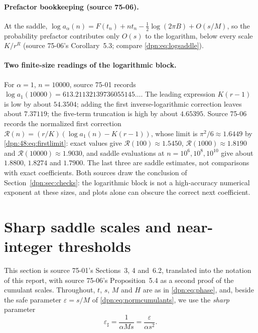 \documentclass[11pt]{article}
\numberwithin{equation}{section}
\theoremstyle{definition}\newtheorem{definition}[theorem]{Definition}
\theoremstyle{remark}\newtheorem{remark}[theorem]{Remark}
\newcommand{\eps}{\varepsilon}
\newcommand{\src}[1]{\textup{(source #1)}}
\newcommand{\epsh}{\varepsilon_{\sharp}}
\begin{document}
\paragraph{Prefactor bookkeeping \src{75-06}.}
At the saddle,
$\log a_\alpha(n)=F(t_n)+nt_n-\tfrac12\log(2\pi B)+O(s/M)$, so the probability
prefactor contributes only $O(s)$ to the logarithm, below every scale
$K/r^R$ (source 75-06's Corollary~5.3; compare \eqref{dpn:eq:logsaddle}).

\paragraph{Two finite-size readings of the logarithmic block.}
For $\alpha=1$, $n=10000$, source 75-01 records
$\log a_1(10000)=613.21132139736055145\ldots$.  The leading expression
$K(r-1)$ is low by about $54.3504$; adding the first inverse-logarithmic
correction leaves about $7.37119$; the five-term truncation is high by about
$4.65395$.  Source 75-06 records the normalized first correction
$\mathcal R(n)=(r/K)(\log a_1(n)-K(r-1))$, whose limit is $\pi^2/6\approx1.6449$
by \eqref{dpn:48:eq:firstlimit}: exact values give $\mathcal R(100)\approx1.5450$,
$\mathcal R(1000)\approx1.8190$ and $\mathcal R(10000)\approx1.9030$, and
saddle evaluations at $n=10^6,10^8,10^{10}$ give about $1.8800$, $1.8274$ and
$1.7900$.  The last three are saddle estimates, not comparisons with exact
coefficients.  Both sources draw the conclusion of
Section~\ref{dpn:sec:checks}: the logarithmic block is not a high-accuracy
numerical exponent at these sizes, and plots alone can obscure the correct
next coefficient.

\section{Sharp saddle scales and near-integer thresholds}\label{dpn:jh:sec:sharp}
This section is source 75-01's Sections~3, 4 and~6.2, translated into the
notation of this report, with source 75-06's Proposition~5.4 as a second proof
of the cumulant scales.  Throughout, $t$, $s$, $M$ and $H$ are as in
\eqref{dpn:eq:phase}, and, beside the safe parameter $\eps=s/M$ of
\eqref{dpn:eq:normcumulants}, we use the \emph{sharp} parameter
\begin{equation}\label{dpn:jh:eq:epsh}
 \epsh=\frac1{\alpha Ms}=\frac{\eps}{\alpha s^2}.
\end{equation}
\end{document}
